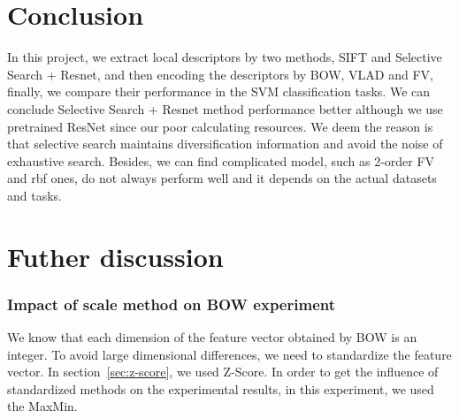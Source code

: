 \documentclass[conference]{IEEEtran}
\begin{document}
\section{Conclusion}
In this project, we extract local descriptors by two methods, SIFT and Selective Search + Resnet, and then encoding the descriptors by BOW, VLAD and FV, finally, we compare their performance in the SVM classification tasks. We can conclude Selective Search + Resnet method performance better although we use pretrained ResNet since our poor calculating resources. We deem the reason is that selective search maintains diversification information and avoid the noise of exhaustive search. Besides, we can find complicated model, such as 2-order FV and rbf ones, do not always perform well and it depends on the actual datasets and tasks.


\section{Futher discussion}
\subsubsection{Impact of scale method on BOW experiment}
We know that each dimension of the feature vector obtained by BOW is an integer. To avoid large dimensional differences, we need to standardize the feature vector. In section~\ref{sec:z-score}, we used Z-Score. In order to get the influence of standardized methods on the experimental results, in this experiment, we used the MaxMin.
\end{document}
